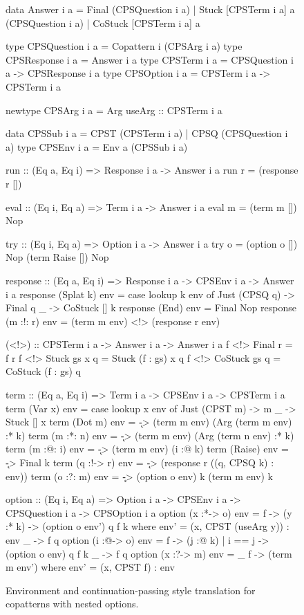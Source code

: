 \begin{figure}
\centering
\renewcommand{\basicstylesize}{\footnotesize}
\begin{haskell}
data Answer i a
  = Final   (CPSQuestion i a)
  | Stuck   [CPSTerm i a] a (CPSQuestion i a)
  | CoStuck [CPSTerm i a] a

type CPSQuestion i a = Copattern i (CPSArg i a)
type CPSResponse i a = Answer i a
type CPSTerm i a = CPSQuestion i a -> CPSResponse i a
type CPSOption i a = CPSTerm i a -> CPSTerm i a

newtype CPSArg i a
  = Arg { useArg :: CPSTerm i a }

data CPSSub i a = CPST (CPSTerm i a)
                | CPSQ (CPSQuestion i a)
type CPSEnv i a = Env a (CPSSub i a)

run :: (Eq a, Eq i) => Response i a -> Answer i a
run r = (response r [])

eval :: (Eq i, Eq a) => Term i a
     -> Answer i a
eval m = (term m []) Nop

try :: (Eq i, Eq a) => Option i a -> Answer i a
try o = (option o []) Nop (term Raise []) Nop

response :: (Eq a, Eq i) => Response i a
         -> CPSEnv i a -> Answer i a
response (Splat k) env = case lookup k env of
  Just (CPSQ q) -> Final q
  _             -> CoStuck [] k 
response (End)     env = Final Nop
response (m :!: r) env
  = (term m env) <!> (response r env)

(<!>) :: CPSTerm i a -> Answer i a
      -> Answer i a
f <!> Final r      = f r
f <!> Stuck gs x q = Stuck (f : gs) x q
f <!> CoStuck gs q = CoStuck (f : gs) q

term :: (Eq a, Eq i) => Term i a -> CPSEnv i a
     -> CPSTerm i a
term (Var x)   env = case lookup x env of
  Just (CPST m) -> m
  _             -> Stuck [] x
term (Dot m)    env
  = \k -> (term m env) (Arg (term m env) :* k)
term (m :*: n)  env
  = \k -> (term m env) (Arg (term n env) :* k)
term (m :@: i)  env = \k -> (term m env) (i :@ k)
term (Raise)    env = \k -> Final k
term (q :!-> r) env
  = \k -> (response r ((q, CPSQ k) : env))
term (o :?: m)  env
  = \k -> (option o env) k (term m env) k

option :: (Eq i, Eq a) => Option i a -> CPSEnv i a
       -> CPSQuestion i a -> CPSOption i a
option (x :*-> o) env = \q f -> \case
  (y :* k) -> (option o env') q f k
    where env' = (x, CPST (useArg y)) : env
  _        -> f q
option (i :@-> o) env = \q f -> \case
  (j :@ k) | i == j -> (option o env) q f k
  _                 -> f q
option (x :?-> m) env = \_ f -> (term m env')
  where env' = (x, CPST f) : env
\end{haskell}
\caption{Environment and continuation-passing style translation for copatterns with nested options.}
\label{fig:nest-env-cps-code}
\end{figure}

